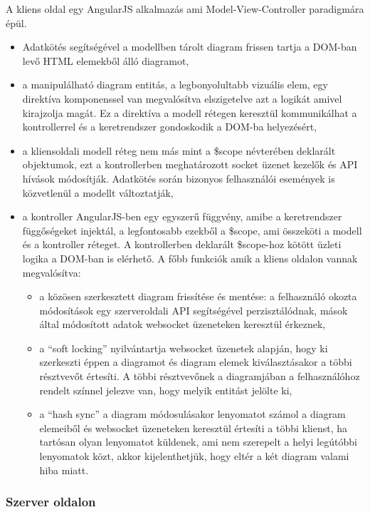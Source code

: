 A kliens oldal egy AngularJS alkalmazás ami Model-View-Controller paradigmára épül.  


\begin{itemize}
\item Adatkötés segítségével a modellben tárolt diagram frissen tartja a DOM-ban levő HTML elemekből álló diagramot, 
\item a manipulálható diagram entitás, a legbonyolultabb vizuális elem, egy direktíva komponenssel van megvalósítva elszigetelve azt a logikát amivel kirajzolja magát. Ez a direktíva a modell rétegen keresztül kommunikálhat a kontrollerrel és a keretrendszer gondoskodik a DOM-ba helyezésért,
\item a kliensoldali modell réteg nem más mint a \$scope névterében deklarált objektumok, ezt a kontrollerben meghatározott socket üzenet kezelők és API hívások módosítják. Adatkötés során bizonyos felhasználói események is közvetlenül a modellt változtatják,
\item a kontroller AngularJS-ben egy egyszerű függvény, amibe a keretrendszer függőségeket injektál, a legfontosabb ezekből a \$scope, ami összeköti a modell és a kontroller réteget. A kontrollerben deklarált \$scope-hoz kötött üzleti logika a DOM-ban is elérhető. A főbb funkciók amik a kliens oldalon vannak megvalósítva:
    \begin{itemize} 
    \item a közösen szerkesztett diagram frissítése és mentése: a felhasználó okozta módosítások egy szerveroldali API segítségével perzisztálódnak, mások által módosított adatok websocket üzeneteken keresztül érkeznek, 
    \item a ``soft locking'' nyilvántartja websocket üzenetek alapján, hogy ki szerkeszti éppen a diagramot és diagram elemek kiválasztásakor a többi résztvevőt értesíti. A többi résztvevőnek a diagramjában a felhasználóhoz rendelt színnel jelezve van, hogy melyik entitást jelölte ki,
    \item a ``hash sync'' a diagram módosulásakor lenyomatot számol a diagram elemeiből és websocket üzeneteken keresztül értesíti a többi klienst, ha tartósan olyan lenyomatot küldenek, ami nem szerepelt a helyi legútóbbi lenyomatok közt, akkor kijelenthetjük, hogy eltér a két diagram valami hiba miatt. 
    \end{itemize}
\end{itemize}

\subsubsection{Szerver oldalon}

